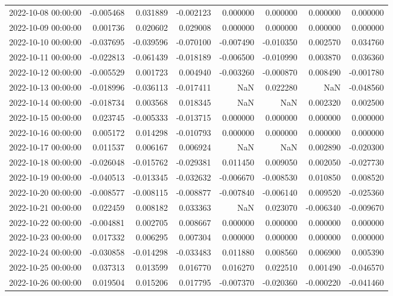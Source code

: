 \begin{tabular}{lrrrrrrr}
2022-10-08 00:00:00 & -0.005468 & 0.031889 & -0.002123 & 0.000000 & 0.000000 & 0.000000 & 0.000000 \\
2022-10-09 00:00:00 & 0.001736 & 0.020602 & 0.029008 & 0.000000 & 0.000000 & 0.000000 & 0.000000 \\
2022-10-10 00:00:00 & -0.037695 & -0.039596 & -0.070100 & -0.007490 & -0.010350 & 0.002570 & 0.034760 \\
2022-10-11 00:00:00 & -0.022813 & -0.061439 & -0.018189 & -0.006500 & -0.010990 & 0.003870 & 0.036360 \\
2022-10-12 00:00:00 & -0.005529 & 0.001723 & 0.004940 & -0.003260 & -0.000870 & 0.008490 & -0.001780 \\
2022-10-13 00:00:00 & -0.018996 & -0.036113 & -0.017411 & NaN & 0.022280 & NaN & -0.048560 \\
2022-10-14 00:00:00 & -0.018734 & 0.003568 & 0.018345 & NaN & NaN & 0.002320 & 0.002500 \\
2022-10-15 00:00:00 & 0.023745 & -0.005333 & -0.013715 & 0.000000 & 0.000000 & 0.000000 & 0.000000 \\
2022-10-16 00:00:00 & 0.005172 & 0.014298 & -0.010793 & 0.000000 & 0.000000 & 0.000000 & 0.000000 \\
2022-10-17 00:00:00 & 0.011537 & 0.006167 & 0.006924 & NaN & NaN & 0.002890 & -0.020300 \\
2022-10-18 00:00:00 & -0.026048 & -0.015762 & -0.029381 & 0.011450 & 0.009050 & 0.002050 & -0.027730 \\
2022-10-19 00:00:00 & -0.040513 & -0.013345 & -0.032632 & -0.006670 & -0.008530 & 0.010850 & 0.008520 \\
2022-10-20 00:00:00 & -0.008577 & -0.008115 & -0.008877 & -0.007840 & -0.006140 & 0.009520 & -0.025360 \\
2022-10-21 00:00:00 & 0.022459 & 0.008182 & 0.033363 & NaN & 0.023070 & -0.006340 & -0.009670 \\
2022-10-22 00:00:00 & -0.004881 & 0.002705 & 0.008667 & 0.000000 & 0.000000 & 0.000000 & 0.000000 \\
2022-10-23 00:00:00 & 0.017332 & 0.006295 & 0.007304 & 0.000000 & 0.000000 & 0.000000 & 0.000000 \\
2022-10-24 00:00:00 & -0.030858 & -0.014298 & -0.033483 & 0.011880 & 0.008560 & 0.006900 & 0.005390 \\
2022-10-25 00:00:00 & 0.037313 & 0.013599 & 0.016770 & 0.016270 & 0.022510 & 0.001490 & -0.046570 \\
2022-10-26 00:00:00 & 0.019504 & 0.015206 & 0.017795 & -0.007370 & -0.020360 & -0.000220 & -0.041460 \\

\end{tabular}
